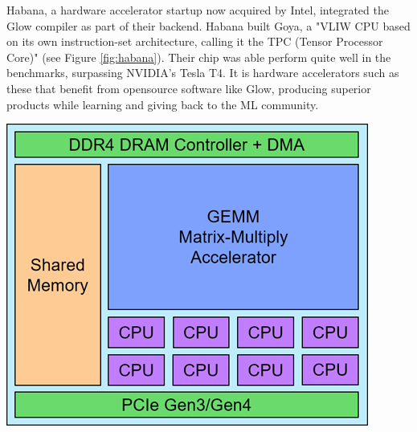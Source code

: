 \documentclass[twocolumn]{article}
\begin{document}
Habana, a hardware accelerator startup now acquired by Intel, integrated the Glow compiler as part of their backend. Habana built Goya, a "VLIW CPU based on its own instruction-set architecture, calling it the TPC (Tensor Processor Core)" \cite{habana} (see Figure \ref{fig:habana}). Their chip was able perform quite well in the benchmarks, surpassing NVIDIA's Tesla T4. It is hardware accelerators such as these that benefit from opensource software like Glow, producing superior products while learning and giving back to the ML community. 


 \begingroup
    \centering
    \medskip
    \includegraphics[width=0.5\columnwidth]{Lab-Tex/final/habana.png}
    \label{fig:habana}
    \medskip
\endgroup






\printbibliography
\end{document}
